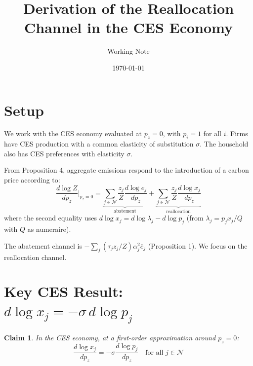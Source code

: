 \documentclass[11pt]{article}
\title{Derivation of the Reallocation Channel in the CES Economy}
\author{Working Note}
\date{\today}
\newtheorem{claim}{Claim}
\newcommand{\N}{\mathcal{N}}
\begin{document}
\maketitle

\section{Setup}

We work with the CES economy evaluated at $p_z = 0$, with $p_i = 1$ for all $i$. Firms have CES production with a common elasticity of substitution $\sigma$. The household also has CES preferences with elasticity $\sigma$.

From Proposition 4, aggregate emissions respond to the introduction of a carbon price according to:
\begin{equation}
    \label{eq:prop4}
    \frac{d\log Z}{dp_z}\bigg|_{p_z=0} = \underbrace{\sum_{j \in \N} \frac{z_j}{Z}\frac{d\log e_j}{dp_z}}_{\text{abatement}} + \underbrace{\sum_{j \in \N} \frac{z_j}{Z}\frac{d\log x_j}{dp_z}}_{\text{reallocation}}
\end{equation}
where the second equality uses $d\log x_j = d\log \lambda_j - d\log p_j$ (from $\lambda_j = p_j x_j / Q$ with $Q$ as numeraire).

The abatement channel is $-\sum_j (\tau_j z_j / Z)\alpha_j^2 \overline{e}_j$ (Proposition 1). We focus on the reallocation channel.

\section{Key CES Result: $d\log x_j = -\sigma\, d\log p_j$}

\begin{claim}
\label{claim:ces}
In the CES economy, at a first-order approximation around $p_z = 0$:
$$\frac{d\log x_j}{dp_z} = -\sigma \frac{d\log p_j}{dp_z} \quad \text{for all } j \in \N$$
\end{claim}
\end{document}

